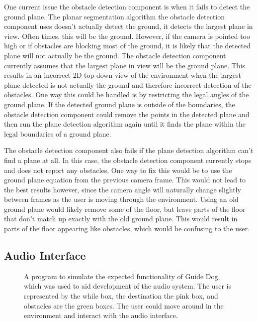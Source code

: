 One current issue the obstacle detection component is when it fails to
detect the ground plane. The planar segmentation algorithm the obstacle
detection component uses doesn't actually detect the ground, it detects the
largest plane in view. Often times, this will be the ground. However, if the
camera is pointed too high or if obstacles are blocking most of the ground, it is
likely that the detected plane will not actually be the ground. The obstacle
detection component currently assumes that the largest plane in view will be the
ground plane. This results in an incorrect 2D top down view of the environment
when the largest plane detected is not actually the ground and therefore
incorrect detection of the obstacles. One way this could be handled is by
restricting the legal angles of the ground plane. If the detected ground plane
is outside of the boundaries, the obstacle detection component could remove the
points in the detected plane and then run the plane detection algorithm again
until it finds the plane within the legal boundaries of a ground plane.

The obstacle detection component also fails if the plane detection algorithm
can't find a plane at all. In this case, the obstacle detection component
currently stops and does not report any obstacles. One way to fix this would be
to use the ground plane equation from the previous camera frame. This would not
lead to the best results however, since the camera angle will naturally change
slightly between frames as the user is moving through the environment. Using an
old ground plane would likely remove some of the floor, but leave parts of the
floor that don't match up exactly with the old ground plane. This would result
in parts of the floor appearing like obstacles, which would be confusing to the
user.


\subsection{Audio Interface}
\label{sec:eval-audio}

\begin{figure}
\caption{A program to simulate the expected functionality of Guide Dog, which was
used to aid development of the audio system. The user is represented by the
while box, the destination the pink box, and obstacles are the green boxes. The
user could move around in the environment and interact with the audio interface.}
\label{fig:vsim}
\end{figure}


